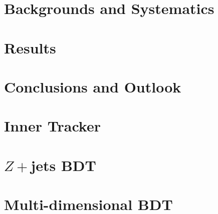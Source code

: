 \documentclass{brandeis-dissertation}
\begin{document}
\chapter{Backgrounds and Systematics}
\label{sec:BackgroundsSys}

\clearpage
\chapter{Results}
\label{sec:Results}

\clearpage
%

\clearpage
\chapter{Conclusions and Outlook}
\label{sec:conclusion}


\clearpage
\begin{singlespacing}


\end{singlespacing}

\clearpage
\appendix
\chapter{Inner Tracker}
\label{sec:ITk}

\chapter{$Z+$jets BDT}
\label{sec:ZjetsBDT}

\chapter{Multi-dimensional BDT}
\label{sec:3DBDT}

\clearpage
\end{document}
